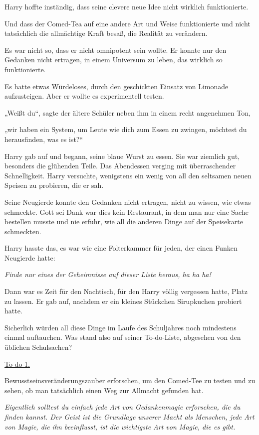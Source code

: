 {Harry hoffte inständig, dass seine clevere neue Idee nicht wirklich funktionierte.

Und dass der Comed-Tea auf eine andere Art und Weise funktionierte und nicht tatsächlich die allmächtige Kraft besaß, die Realität zu verändern.

Es war nicht so, dass er nicht omnipotent sein wollte. Er konnte nur den Gedanken nicht ertragen, in einem Universum zu leben, das wirklich so funktionierte.

Es hatte etwas Würdeloses, durch den geschickten Einsatz von Limonade aufzusteigen. Aber er wollte es experimentell testen.

„Weißt du“, sagte der ältere Schüler neben ihm in einem recht angenehmen Ton,

„wir haben ein System, um Leute wie dich zum Essen zu zwingen, möchtest du herausfinden, was es ist?“

Harry gab auf und begann, seine blaue Wurst zu essen. Sie war ziemlich gut, besonders die glühenden Teile. Das Abendessen verging mit überraschender Schnelligkeit. Harry versuchte, wenigstens ein wenig von all den seltsamen neuen Speisen zu probieren, die er sah.

Seine Neugierde konnte den Gedanken nicht ertragen, nicht zu wissen, wie etwas schmeckte. Gott sei Dank war dies kein Restaurant, in dem man nur eine Sache bestellen musste und nie erfuhr, wie all die anderen Dinge auf der Speisekarte schmeckten.

Harry hasste das, es war wie eine Folterkammer für jeden, der einen Funken Neugierde hatte:

\emph{Finde nur eines der Geheimnisse auf dieser Liste heraus, ha ha ha!}

Dann war es Zeit für den Nachtisch, für den Harry völlig vergessen hatte, Platz zu lassen. Er gab auf, nachdem er ein kleines Stückchen Sirupkuchen probiert hatte.

Sicherlich würden all diese Dinge im Laufe des Schuljahres noch mindestens einmal auftauchen. Was stand also auf seiner To-do-Liste, abgesehen von den üblichen Schulsachen?

\uline{To-do 1.}

Bewusstseinsveränderungszauber erforschen, um den Comed-Tee zu testen und zu sehen, ob man tatsächlich einen Weg zur Allmacht gefunden hat.

\emph{Eigentlich solltest du einfach jede Art von Gedankenmagie erforschen, die du finden kannst. Der Geist ist die Grundlage unserer Macht als Menschen, jede Art von Magie, die ihn beeinflusst, ist die wichtigste Art von Magie, die es gibt.}

}
